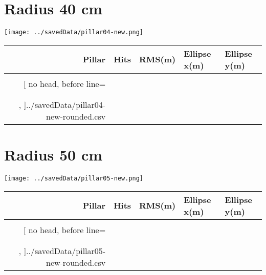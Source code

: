 \documentclass{article}
\begin{document}
\section{Radius 40 cm}
\begin{center}
\texttt{[image: ../savedData/pillar04-new.png]}

\begin{tabular}{r|llll}
	\toprule%
	\bfseries Pillar & \bfseries Hits & \bfseries RMS(m) & \bfseries Ellipse x(m) & \bfseries Ellipse y(m)\\\midrule\\[-0.8cm]
	\csvreader[%
	  no head,
	  before line=\ifthenelse{\equal{\csvcoli}{Average}}{\\\midrule}{\\},
	  late after last line = \\\bottomrule,
	]{../savedData/pillar04-new-rounded.csv}{}{%
	  \csvcoli&\csvcolii&\csvcoliii&\csvcoliv&\csvcolv
	}
\end{tabular}
\end{center}



\newpage

\section{Radius 50 cm}
\begin{center}
\texttt{[image: ../savedData/pillar05-new.png]}

\begin{tabular}{r|llll}
	\toprule%
	\bfseries Pillar & \bfseries Hits & \bfseries RMS(m) & \bfseries Ellipse x(m) & \bfseries Ellipse y(m)\\\midrule\\[-0.8cm]
	\csvreader[%
	  no head,
	  before line=\ifthenelse{\equal{\csvcoli}{Average}}{\\\midrule}{\\},
	  late after last line = \\\bottomrule,
	]{../savedData/pillar05-new-rounded.csv}{}{%
	  \csvcoli&\csvcolii&\csvcoliii&\csvcoliv&\csvcolv
	}
\end{tabular}
\end{center}
\end{document}
